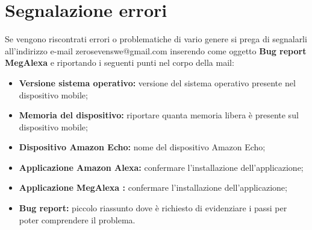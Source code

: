 \chapter{Segnalazione errori}
\label{SegnalazioneErrori}
Se vengono riscontrati errori o problematiche di vario genere si prega di segnalarli all’indirizzo
e-mail zerosevenswe@gmail.com inserendo come oggetto \textbf{Bug report MegAlexa}  e riportando i seguenti punti nel corpo della mail:
 \begin{itemize}
	\item \textbf{Versione sistema operativo:} versione del sistema operativo presente nel dispositivo mobile;
	\item \textbf{Memoria del dispositivo:} riportare quanta memoria libera è presente sul dispositivo mobile;
	\item \textbf{Dispositivo Amazon Echo:} nome del dispositivo Amazon Echo;
	\item \textbf{Applicazione Amazon Alexa:} confermare l'installazione dell'applicazione;
	\item \textbf{Applicazione MegAlexa :}  confermare l'installazione dell'applicazione;
	\item \textbf{Bug report:} piccolo riassunto dove è richiesto di evidenziare i passi per poter 
	comprendere il problema.
\end{itemize}
